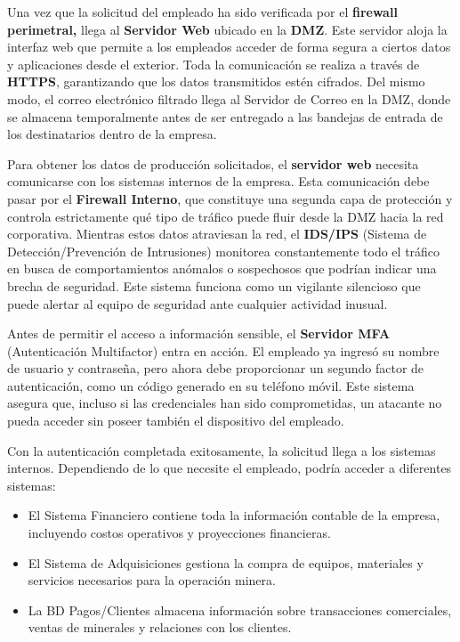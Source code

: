 Una vez que la solicitud del empleado ha sido verificada por el \textbf{firewall perimetral,} llega al \textbf{Servidor Web} ubicado en la \textbf{DMZ}. Este servidor aloja la interfaz web que permite a los empleados acceder de forma segura a ciertos datos y aplicaciones desde el exterior. Toda la comunicación se realiza a través de \textbf{HTTPS}, garantizando que los datos transmitidos estén cifrados.
Del mismo modo, el correo electrónico filtrado llega al Servidor de Correo en la DMZ, donde se almacena temporalmente antes de ser entregado a las bandejas de entrada de los destinatarios dentro de la empresa.

 
Para obtener los datos de producción solicitados, el \textbf{servidor web} necesita comunicarse con los sistemas internos de la empresa. Esta comunicación debe pasar por el \textbf{Firewall Interno}, que constituye una segunda capa de protección y controla estrictamente qué tipo de tráfico puede fluir desde la DMZ hacia la red corporativa.
Mientras estos datos atraviesan la red, el \textbf{IDS/IPS }(Sistema de Detección/Prevención de Intrusiones) monitorea constantemente todo el tráfico en busca de comportamientos anómalos o sospechosos que podrían indicar una brecha de seguridad. Este sistema funciona como un vigilante silencioso que puede alertar al equipo de seguridad ante cualquier actividad inusual.


Antes de permitir el acceso a información sensible, el \textbf{Servidor MFA} (Autenticación Multifactor) entra en acción. El empleado ya ingresó su nombre de usuario y contraseña, pero ahora debe proporcionar un segundo factor de autenticación, como un código generado en su teléfono móvil. Este sistema asegura que, incluso si las credenciales han sido comprometidas, un atacante no pueda acceder sin poseer también el dispositivo del empleado.


Con la autenticación completada exitosamente, la solicitud llega a los sistemas internos. Dependiendo de lo que necesite el empleado, podría acceder a diferentes sistemas:
\begin{itemize}
    \item El Sistema Financiero contiene toda la información contable de la empresa, incluyendo costos operativos y proyecciones financieras.
    \item El Sistema de Adquisiciones gestiona la compra de equipos, materiales y servicios necesarios para la operación minera.
    \item La BD Pagos/Clientes almacena información sobre transacciones comerciales, ventas de minerales y relaciones con los clientes.

\end{itemize}



